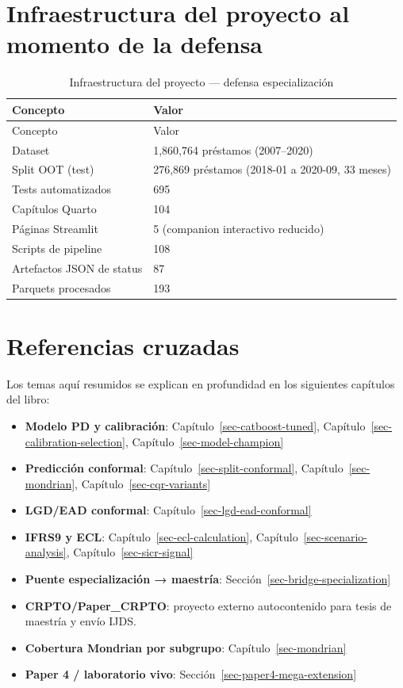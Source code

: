 \documentclass[
  spanish,
  11pt,
  letterpaper,
]{scrbook}
\providecommand{\tightlist}{%
  \setlength{\itemsep}{0pt}\setlength{\parskip}{0pt}}
\theoremstyle{plain}
\theoremstyle{remark}
\begin{document}
\section{Infraestructura del proyecto al momento de la
defensa}\label{infraestructura-del-proyecto-al-momento-de-la-defensa}

\begin{longtable}[]{@{}ll@{}}
\caption{Infraestructura del proyecto --- defensa
especialización}\label{tbl-snapshot-infra}\tabularnewline
\toprule\noalign{}
Concepto & Valor \\
\midrule\noalign{}
\endfirsthead
\toprule\noalign{}
Concepto & Valor \\
\midrule\noalign{}
\endhead
\bottomrule\noalign{}
\endlastfoot
Dataset & 1,860,764 préstamos (2007--2020) \\
Split OOT (test) & 276,869 préstamos (2018-01 a 2020-09, 33 meses) \\
Tests automatizados & 695 \\
Capítulos Quarto & 104 \\
Páginas Streamlit & 5 (companion interactivo reducido) \\
Scripts de pipeline & 108 \\
Artefactos JSON de status & 87 \\
Parquets procesados & 193 \\
\end{longtable}

\section{Referencias cruzadas}\label{referencias-cruzadas}

Los temas aquí resumidos se explican en profundidad en los siguientes
capítulos del libro:

\begin{itemize}
\tightlist
\item
  \textbf{Modelo PD y calibración}: Capítulo~\ref{sec-catboost-tuned},
  Capítulo~\ref{sec-calibration-selection},
  Capítulo~\ref{sec-model-champion}
\item
  \textbf{Predicción conformal}: Capítulo~\ref{sec-split-conformal},
  Capítulo~\ref{sec-mondrian}, Capítulo~\ref{sec-cqr-variants}
\item
  \textbf{LGD/EAD conformal}: Capítulo~\ref{sec-lgd-ead-conformal}
\item
  \textbf{IFRS9 y ECL}: Capítulo~\ref{sec-ecl-calculation},
  Capítulo~\ref{sec-scenario-analysis}, Capítulo~\ref{sec-sicr-signal}
\item
  \textbf{Puente especialización → maestría}:
  Sección~\ref{sec-bridge-specialization}
\item
  \textbf{CRPTO/Paper\_CRPTO}: proyecto externo autocontenido para tesis
  de maestría y envío IJDS.
\item
  \textbf{Cobertura Mondrian por subgrupo}: Capítulo~\ref{sec-mondrian}
\item
  \textbf{Paper 4 / laboratorio vivo}:
  Sección~\ref{sec-paper4-mega-extension}
\end{itemize}
\end{document}
